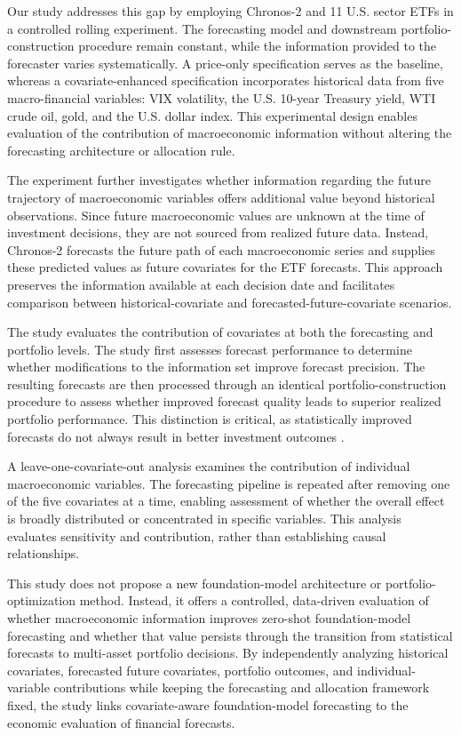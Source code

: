 \documentclass[12pt,a4paper,twoside,openany]{book}
\begin{document}
Our study addresses this gap by employing Chronos-2 and 11 U.S. sector ETFs in a controlled rolling experiment. The forecasting model and downstream portfolio-construction procedure remain constant, while the information provided to the forecaster varies systematically. A price-only specification serves as the baseline, whereas a covariate-enhanced specification incorporates historical data from five macro-financial variables: VIX volatility, the U.S. 10-year Treasury yield, WTI crude oil, gold, and the U.S. dollar index. This experimental design enables evaluation of the contribution of macroeconomic information without altering the forecasting architecture or allocation rule.

The experiment further investigates whether information regarding the future trajectory of macroeconomic variables offers additional value beyond historical observations. Since future macroeconomic values are unknown at the time of investment decisions, they are not sourced from realized future data. Instead, Chronos-2 forecasts the future path of each macroeconomic series and supplies these predicted values as future covariates for the ETF forecasts. This approach preserves the information available at each decision date and facilitates comparison between historical-covariate and forecasted-future-covariate scenarios.

The study evaluates the contribution of covariates at both the forecasting and portfolio levels. The study first assesses forecast performance to determine whether modifications to the information set improve forecast precision. The resulting forecasts are then processed through an identical portfolio-construction procedure to assess whether improved forecast quality leads to superior realized portfolio performance. This distinction is critical, as statistically improved forecasts do not always result in better investment outcomes \cite{engel2025scaling,pishehvar2026threephase}.

A leave-one-covariate-out analysis examines the contribution of individual macroeconomic variables. The forecasting pipeline is repeated after removing one of the five covariates at a time, enabling assessment of whether the overall effect is broadly distributed or concentrated in specific variables. This analysis evaluates sensitivity and contribution, rather than establishing causal relationships.

This study does not propose a new foundation-model architecture or portfolio-optimization method. Instead, it offers a controlled, data-driven evaluation of whether macroeconomic information improves zero-shot foundation-model forecasting and whether that value persists through the transition from statistical forecasts to multi-asset portfolio decisions. By independently analyzing historical covariates, forecasted future covariates, portfolio outcomes, and individual-variable contributions while keeping the forecasting and allocation framework fixed, the study links covariate-aware foundation-model forecasting to the economic evaluation of financial forecasts.
\end{document}
